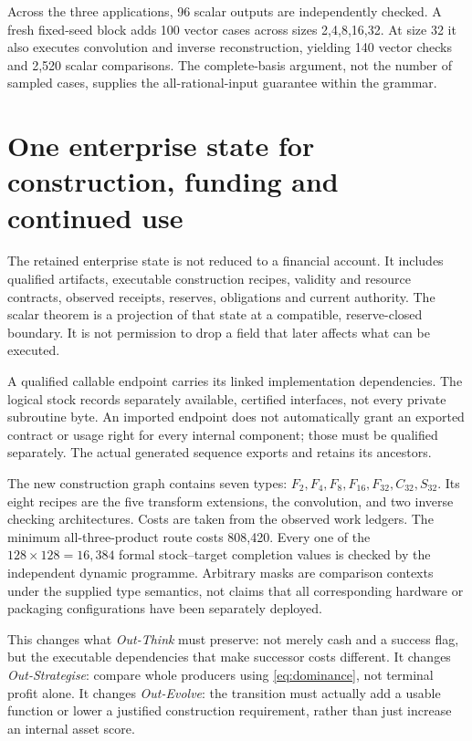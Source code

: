 \documentclass[11pt,letterpaper]{article}
\theoremstyle{definition}\newtheorem{definition}[theorem]{Definition}
\theoremstyle{remark}\newtheorem{remark}[theorem]{Remark}
\begin{document}
Across the three applications, 96 scalar outputs are independently checked. A fresh fixed-seed block adds 100 vector cases across sizes 2,4,8,16,32. At size 32 it also executes convolution and inverse reconstruction, yielding 140 vector checks and 2,520 scalar comparisons. The complete-basis argument, not the number of sampled cases, supplies the all-rational-input guarantee within the grammar.

\section{One enterprise state for construction, funding and continued use}
\label{sec:finance}
The retained enterprise state is not reduced to a financial account. It includes qualified artifacts, executable construction recipes, validity and resource contracts, observed receipts, reserves, obligations and current authority. The scalar theorem is a projection of that state at a compatible, reserve-closed boundary. It is not permission to drop a field that later affects what can be executed.

A qualified callable endpoint carries its linked implementation dependencies. The logical stock records separately available, certified interfaces, not every private subroutine byte. An imported endpoint does not automatically grant an exported contract or usage right for every internal component; those must be qualified separately. The actual generated sequence exports and retains its ancestors.

The new construction graph contains seven types: $F_2,F_4,F_8,F_{16},F_{32},C_{32},S_{32}$. Its eight recipes are the five transform extensions, the convolution, and two inverse checking architectures. Costs are taken from the observed work ledgers. The minimum all-three-product route costs 808,420. Every one of the $128\times128=16,384$ formal stock--target completion values is checked by the independent dynamic programme. Arbitrary masks are comparison contexts under the supplied type semantics, not claims that all corresponding hardware or packaging configurations have been separately deployed.

This changes what \emph{Out-Think} must preserve: not merely cash and a success flag, but the executable dependencies that make successor costs different. It changes \emph{Out-Strategise}: compare whole producers using \eqref{eq:dominance}, not terminal profit alone. It changes \emph{Out-Evolve}: the transition must actually add a usable function or lower a justified construction requirement, rather than just increase an internal asset score.
\end{document}
